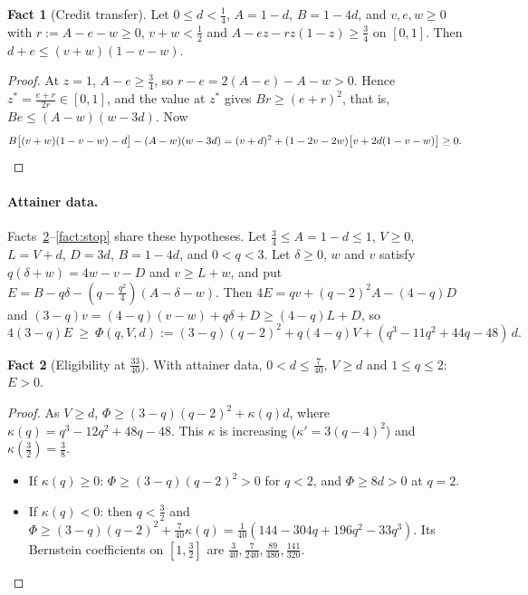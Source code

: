 \documentclass[11pt,a4paper]{article}
\numberwithin{equation}{section}
\theoremstyle{definition}
\newtheorem{fact}{Fact}
\begin{document}
\begin{fact}[Credit transfer]\label{fact:transfer}Let $0\le d<\frac14$, $A=1-d$, $B=1-4d$, and $v,e,w\ge0$ with
$r:=A-e-w\ge0$, $v+w<\frac12$ and $A-ez-rz(1-z)\ge\frac34$ on $[0,1]$. Then
$d+e\le(v+w)(1-v-w)$.
\end{fact}
\begin{proof}
At $z=1$, $A-e\ge\frac34$, so $r-e=2(A-e)-A-w>0$. Hence
$z^*=\frac{e+r}{2r}\in[0,1]$, and the value at $z^*$ gives $Br\ge(e+r)^2$, that
is, $Be\le(A-w)(w-3d)$. Now
\[
B\bigl[(v+w)(1-v-w)-d\bigr]-(A-w)(w-3d)=(v+d)^2+(1-2v-2w)\bigl[v+2d(1-v-w)\bigr]\ge0.\qedhere
\]
\end{proof}

\paragraph{Attainer data.} Facts~\ref{fact:elig33}--\ref{fact:stop} share these
hypotheses. Let $\frac34\le A=1-d\le1$, $V\ge0$, $L=V+d$, $D=3d$, $B=1-4d$, and
$0<q<3$. Let $\delta\ge0$, $w$ and $v$ satisfy $q(\delta+w)=4w-v-D$ and
$v\ge L+w$, and put $E=B-q\delta-(q-\frac{q^2}4)(A-\delta-w)$. Then
$4E=qv+(q-2)^2A-(4-q)D$ and $(3-q)v=(4-q)(v-w)+q\delta+D\ge(4-q)L+D$, so
\begin{equation}\label{eq:Phi}
4(3-q)E\ \ge\ \Phi(q,V,d):=(3-q)(q-2)^2+q(4-q)V+(q^3-11q^2+44q-48)\,d .
\end{equation}

\begin{fact}[Eligibility at $\frac{33}{40}$]\label{fact:elig33}With attainer data, $0<d\le\frac7{40}$, $V\ge d$ and $1\le q\le2$: $E>0$.
\end{fact}
\begin{proof}
As $V\ge d$, $\Phi\ge(3-q)(q-2)^2+\kappa(q)d$, where
$\kappa(q)=q^3-12q^2+48q-48$. This $\kappa$ is increasing
($\kappa'=3(q-4)^2$) and $\kappa(\frac32)=\frac38$.
\begin{itemize}
\item If $\kappa(q)\ge0$: $\Phi\ge(3-q)(q-2)^2>0$ for $q<2$, and $\Phi\ge8d>0$
at $q=2$.
\item If $\kappa(q)<0$: then $q<\frac32$ and
$\Phi\ge(3-q)(q-2)^2+\frac7{40}\kappa(q)=\frac1{40}(144-304q+196q^2-33q^3)$. Its
Bernstein coefficients on $[1,\frac32]$ are $\frac3{40},\frac7{240},\frac{89}{480},\frac{141}{320}$.
\qedhere
\end{itemize}
\end{proof}
\end{document}

